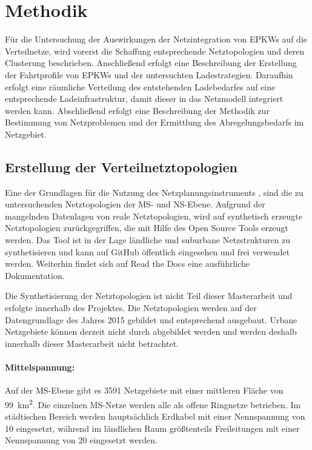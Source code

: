 \section{Methodik}\label{chap:Methodik}

Für die Untersuchung der Auswirkungen der Netzintegration von \glspl{EPKW} auf die Verteilnetze, wird vorerst die Schaffung entsprechende Netztopologien und deren Clusterung beschrieben.
Anschließend erfolgt eine Beschreibung der Erstellung der Fahrtprofile von \glspl{EPKW} und der untersuchten Ladestrategien.
Daraufhin erfolgt eine räumliche Verteilung des entstehenden Ladebedarfes auf eine entsprechende Ladeinfrastruktur, damit dieser in das Netzmodell integriert werden kann.
Abschließend erfolgt eine Beschreibung der Methodik zur Bestimmung von Netzproblemen und der Ermittlung des Abregelungsbedarfs im Netzgebiet.


\subsection{Erstellung der Verteilnetztopologien}\label{chap:dingo_theo}

Eine der Grundlagen für die Nutzung des Netzplanungsinstruments \edisgodot, sind die zu untersuchenden Netztopologien der \gls{MS}- und \gls{NS}-Ebene.
Aufgrund der mangelnden Datenlagen von reale Netztopologien, wird auf synthetisch erzeugte Netztopologien zurückgegriffen, die mit Hilfe des Open Source Tools \dingo erzeugt werden.
Das Tool ist in der Lage ländliche und suburbane Netzstrukturen zu synthetisieren und kann auf GitHub \cite{dingo2019} öffentlich eingesehen und frei verwendet werden.
Weiterhin findet sich auf Read the Docs \cite{dingo-docs2019} eine ausführliche Dokumentation.\medskip

Die Synthetisierung der Netztopologien ist nicht Teil dieser Masterarbeit und erfolgte innerhalb des \openego Projektes. \cite{Mueller2019}
Die Netztopologien werden auf der Datengrundlage des Jahres \num{2015} gebildet und entsprechend ausgebaut.
Urbane Netzgebiete können derzeit nicht durch \dingo abgebildet werden und werden deshalb innerhalb dieser Masterarbeit nicht betrachtet.


\paragraph{Mittelspannung:}

Auf der \gls{MS}-Ebene gibt es \num{3591} Netzgebiete mit einer mittleren Fläche von \SI{99}{\km\squared}.
Die einzelnen \gls{MS}-Netze werden alle als offene Ringnetze betrieben.
Im städtischen Bereich werden hauptsächlich Erdkabel mit einer Nennspannung von \SI{10}{\kv} eingesetzt, während im ländlichen Raum größtenteils Freileitungen mit einer Nennspannung von \SI{20}{\kv} eingesetzt werden. \cite{Mueller2019}\medskip

